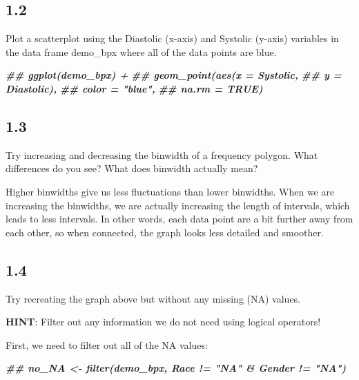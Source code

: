 \documentclass[
]{book}
\newenvironment{Shaded}{\begin{snugshade}}{\end{snugshade}}
\newcommand{\DocumentationTok}[1]{\textcolor[rgb]{0.56,0.35,0.01}{\textbf{\textit{#1}}}}
\begin{document}
\hypertarget{section-29}{%
\subsection{1.2}\label{section-29}}

Plot a scatterplot using the Diastolic (x-axis) and Systolic (y-axis) variables in the data frame demo\_bpx where all of the data points are blue.

\begin{Shaded}
\begin{Highlighting}[]
\DocumentationTok{\#\# ggplot(demo\_bpx) +}
\DocumentationTok{\#\#   geom\_point(aes(x = Systolic, }
\DocumentationTok{\#\#                  y = Diastolic), }
\DocumentationTok{\#\#              color = "blue",}
\DocumentationTok{\#\#              na.rm = TRUE)}
\end{Highlighting}
\end{Shaded}

\hypertarget{section-30}{%
\subsection{1.3}\label{section-30}}

Try increasing and decreasing the binwidth of a frequency polygon. What differences do you see? What does binwidth actually mean?

Higher binwidths give us less fluctuations than lower binwidths. When we are increasing the binwidths, we are actually increasing the length of intervals, which leads to less intervals. In other words, each data point are a bit further away from each other, so when connected, the graph looks less detailed and smoother.

\hypertarget{section-31}{%
\subsection{1.4}\label{section-31}}

Try recreating the graph above but without any missing (NA) values.

\textbf{HINT}: Filter out any information we do not need using logical operators!

First, we need to filter out all of the NA values:

\begin{Shaded}
\begin{Highlighting}[]
\DocumentationTok{\#\# no\_NA \textless{}{-} filter(demo\_bpx, Race != "NA" \& Gender != "NA")}
\end{Highlighting}
\end{Shaded}
\end{document}
